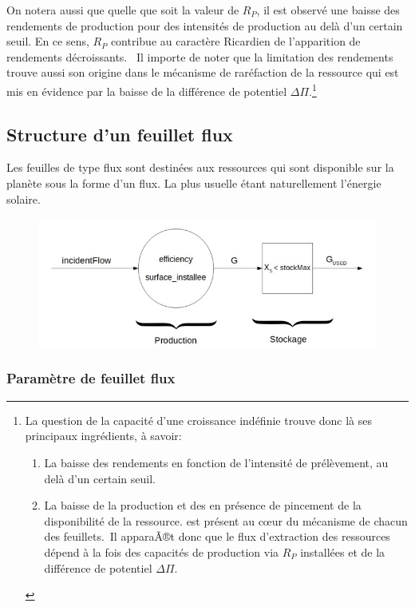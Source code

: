 \documentclass[12pt,a4paper]{article}%
\begin{document}
On notera aussi que quelle que soit la valeur de $R_{P}$, il est observé une
baisse des rendements de production pour des intensités de production au
delà d'un certain seuil. En ce sens, $R_{P}$ contribue au caractère
Ricardien de l'apparition de rendements décroissants. \ Il importe de noter
que la limitation des rendements trouve aussi son origine dans le mécanisme de
raréfaction de la ressource qui est mis en évidence par la baisse de la
différence de potentiel $\Delta\Pi$.\footnote{La question de la
capacité d'une croissance indéfinie trouve donc là ses principaux ingrédients,
à savoir:
\par
\begin{enumerate}
\item La baisse des rendements en fonction de l'intensité de prélèvement, au
delà d'un certain seuil.
\par
\item La baisse de la production et des en présence de pincement de la
disponibilité de la ressource. est présent au c\oe ur du mécanisme de chacun
des feuillets.\ Il apparaÃ®t donc que le flux d'extraction des ressources
dépend à la fois des capacités de production via $R_{P}$ installées et de la
différence de potentiel $\Delta\Pi$.
\end{enumerate}
}

\subsection{Structure d'un feuillet flux}

Les feuilles de type flux sont destinées aux ressources qui sont disponible
sur la planète sous la forme d'un flux. La plus usuelle étant
naturellement l'énergie solaire.

\begin{figure}[h]
\centering
\includegraphics[width=1.0\textwidth]{figures/FeuilleFlux.jpg}\end{figure}

\subsubsection{Paramètre de feuillet flux}
\end{document}
